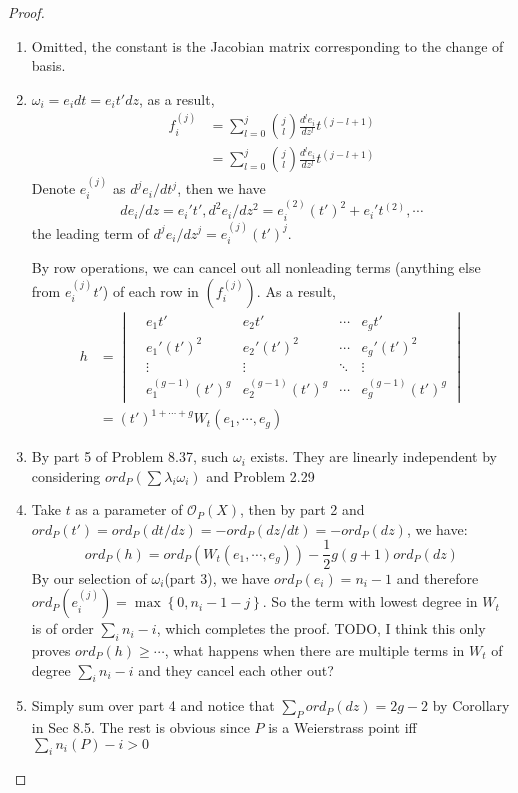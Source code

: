 \documentclass{solution}
\begin{document}
\begin{proof}
    \begin{enumerate}
        \item Omitted, the constant is the Jacobian matrix corresponding to the change of basis.
        \item $\omega_i = e_i dt = e_i t' dz$, as a result,
        $$
            \begin{aligned}
            f_i^{(j)} &= \sum\limits_{l = 0}^{j} {j \choose l} \frac{d^l e_i}{dz^l} t^{(j - l + 1)} \\
            &= \sum\limits_{l = 0}^{j} {j \choose l} \frac{d^l e_i}{dz^l} t^{(j - l + 1)} 
            \end{aligned}
        $$
        Denote $e_i^{(j)}$ as $d^j e_i / dt^j$, then we have
        $$d e_i / dz = e_i' t', d^2 e_i / dz^2 = e_i^{(2)} (t')^2 + e_i' t^{(2)}, \cdots$$
        the leading term of $d^{j} e_i / dz^j = e_i^{(j)} (t')^j$.

        By row operations, we can cancel out all nonleading terms (anything else from $e_i^{(j)} t'$) of each row in $(f_i^{(j)})$. As a result,
        $$
            \begin{aligned}
                h &= \begin{vmatrix}
                    &e_1t' &e_2t' &\cdots &e_g t' \\
                    &e_1'(t')^2 &e_2'(t')^2 &\cdots &e_g' (t')^2 \\
                    & \vdots &\vdots &\ddots &\vdots \\
                    &e_1^{(g - 1)} (t')^g &e_2^{(g - 1)} (t')^g &\cdots & e_g^{(g - 1)} (t')^g
                \end{vmatrix} \\
                &= (t')^{1 + \cdots + g} W_t(e_1, \cdots, e_g)
            \end{aligned}
        $$
        \item By part 5 of Problem 8.37, such $\omega_i$ exists. They are linearly independent by considering $ord_P(\sum \lambda_i \omega_i)$ and Problem 2.29
        \item Take $t$ as a parameter of $\mathcal{O}_{P}(X)$, then by part 2 and $ord_P(t') = ord_P(dt / dz) = -ord_P(dz / dt) = -ord_P(dz)$, we have:
        $$ord_P(h) = ord_P (W_t(e_1, \cdots, e_g)) - \frac{1}{2} g(g + 1) ord_P(dz)$$
        By our selection of $\omega_i$(part 3), we have $ord_P (e_i) = n_i - 1$ and therefore $ord_P(e_i^{(j)}) = \max \left\lbrace 0, n_i - 1 - j \right\rbrace$. So the term with lowest degree in $W_t$ is of order $\sum\limits_{i} n_i - i$, which completes the proof. {\color{red} TODO, I think this only proves $ord_P(h) \ge \cdots$, what happens when there are multiple terms in $W_t$ of degree $\sum\limits_{i} n_i - i$ and they cancel each other out?}
        \item Simply sum over part 4 and notice that $\sum\limits_{P} ord_P(dz) = 2g - 2$ by Corollary in Sec 8.5. The rest is obvious since $P$ is a Weierstrass point iff $\sum\limits_{i} n_i(P) - i \gt 0$
    \end{enumerate}
\end{proof}
\end{document}
